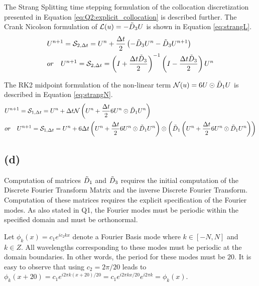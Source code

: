 \documentclass[12pt,dvipsnames]{article}
\begin{document}
The Strang Splitting time stepping formulation of the collocation discretization presented in Equation \ref{eq:Q2:explicit_collocation} is described further. The Crank Nicolson formulation of $\mathcal{L}(u) = -\Tilde{D}_3 U$ is shown in Equation \ref{eq:strangL}.
\begin{equation}
\begin{aligned}
    & U^{n + 1} = \mathcal{S}_{2, \Delta t} = U^n + \frac{\Delta t}{2}\left( -\Tilde{D}_3 U^n - \Tilde{D}_3 U^{n + 1} \right) \\
    & or \quad U^{n + 1} = \mathcal{S}_{2, \Delta t} = \left( I + \frac{\Delta t \Tilde{D}_3 }{2} \right)^{-1} \left( I - \frac{\Delta t \Tilde{D}_3}{2} \right) U^n
\end{aligned} 
\label{eq:strangL}
\end{equation}

The RK2 midpoint formulation of the non-linear term $\mathcal{N}(u) = 6U \odot \Tilde{D}_1 U$ is described in Equation \ref{eq:strangN}.
\begin{equation}
    \begin{aligned}
        & U^{n + 1} = \mathcal{S}_{1, \Delta t} = U^{n} + \Delta t \mathcal{N}\left( U^n + \frac{\Delta t}{2} 6U^n \odot \Tilde{D}_1 U^n \right) \\
        &  or \quad U^{n + 1} = \mathcal{S}_{1, \Delta t} = U^{n} + 6 \Delta t \left( U^n + \frac{\Delta t}{2} 6U^n \odot \Tilde{D}_1 U^n \right) \odot \left( \Tilde{D}_1 \left( U^n + \frac{\Delta t}{2} 6U^n \odot \Tilde{D}_1 U^n \right) \right)
    \end{aligned}
\label{eq:strangN}
\end{equation}
\subsection{(d)}
Computation of matrices $\Tilde{D}_1$ and $\Tilde{D}_3$ requires the initial computation of the Discrete Fourier Transform Matrix and the inverse Discrete Fourier Transform. Computation of these matrices requires the explicit specification of the Fourier modes. As also stated in Q1, the Fourier modes must be periodic within the specified domain and must be orthonormal. 

Let $\phi_k(x) = c_1 e^{i c_2 k x}$ denote a Fourier Basis mode where $k \in [-N, N]$ and $k \in Z$. All wavelengths corresponding to these modes must be periodic at the domain boundaries. In other words, the period for these modes must be $20$. It is easy to observe that using $c_2 = 2\pi / 20$ leads to $\phi_k(x + 20) = c_1 e^{i2 \pi k (x + 20)/20} = c_1 e^{i2 \pi k x/20} e^{i 2\pi k} = \phi_k(x)$. 
\end{document}

